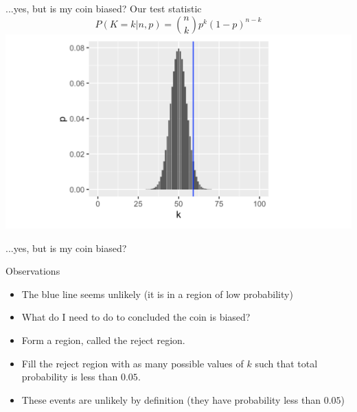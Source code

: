 \documentclass{bredelebeamer}
\begin{document}
\begin{frame}{...yes, but is my coin biased?}
Our test statistic
\begin{equation}
P(K = k|n, p) = {n \choose k}p^k(1-p)^{n - k}
\end{equation}
\includegraphics[width=1\textwidth]{teststatistics}



\end{frame}

\begin{frame}{...yes, but is my coin biased?}
\begin{block}{Observations}
	\begin{itemize}
		\item The blue line seems unlikely (it is in a region of low probability)
		\item What do I need to do to concluded the coin is biased?
		\item Form a region, called the reject region.
		\item Fill the reject region with as many possible values of $k$ such that total probability is less than $0.05$.
		\item These events are unlikely by definition (they have probability less than $0.05$)
	\end{itemize}

\end{block}

\end{frame}
\end{document}
